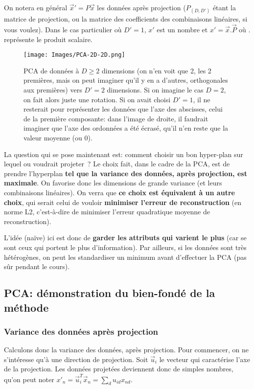 \documentclass[french,twoside]{article}
\begin{document}
On notera en général $\vec x' = P \vec x$ les données après projection ($P_{(D, D')}$ étant la matrice de projection, ou la matrice des coefficients des combinaisons linéaires, si vous voulez). Dans le cas particulier où $D' = 1$, $x'$ est un nombre et $x' = \vec{x} . \vec{P}$ où $.$ représente le produit scalaire.

\begin{figure}[h]
\centering
\texttt{[image: Images/PCA-2D-2D.png]}
\caption{
\label{fig:PCA-2D-2D}
PCA de données à $D\geq 2$ dimensions (on n'en voit que 2, les 2 premières, mais on peut imaginer qu'il y en a d'autres, orthogonales aux premières) vers $D'=2$ dimensions. Si on imagine le cas $D=2$, on fait alors juste une rotation. Si on avait choisi $D'=1$, il ne resterait pour représenter les données que l'axe des abscisses, celui de la première composante: dans l'image de droite, il faudrait imaginer que l'axe des ordonnées a été écrasé, qu'il n'en reste que la valeur moyenne (ou 0).}
\end{figure} 

La question qui se pose maintenant est: comment choisir un bon hyper-plan sur lequel ou voudrait projeter~? 
Le choix fait, dans le cadre de la PCA, est de prendre l'hyperplan \textbf{tel que la variance des données, après projection, est maximale}. On favorise donc les dimensions de grande variance (et leurs combinaisons linéaires).
On verra que \textbf{ce choix est équivalent à un autre choix}, qui serait celui de vouloir \textbf{minimiser l'erreur de reconstruction} (en norme L2, c'est-à-dire de minimiser l'erreur quadratique moyenne de reconstruction).

L'idée (naïve) ici est donc de \textbf{garder les attributs qui varient le plus} (car se sont ceux qui portent le plus d'information). Par ailleurs, si les données sont très hétérogènes, on peut les standardiser un minimum avant d'effectuer la PCA (pas sûr pendant le cours).

\subsection{PCA: démonstration du bien-fondé de la méthode}
 
\subsubsection{Variance des données après projection}
Calculons donc la variance des données, après projection. Pour commencer, on ne s'intéresse qu'à une direction de projection.
Soit $\vec u_i$ le vecteur qui caractérise l'axe de la projection. 
Les données projetées deviennent donc de simples nombres, qu'on peut noter $x'_n=\vec u_i^T \vec x_n = \sum_d u_{id} x_{nd}$.
\end{document}
